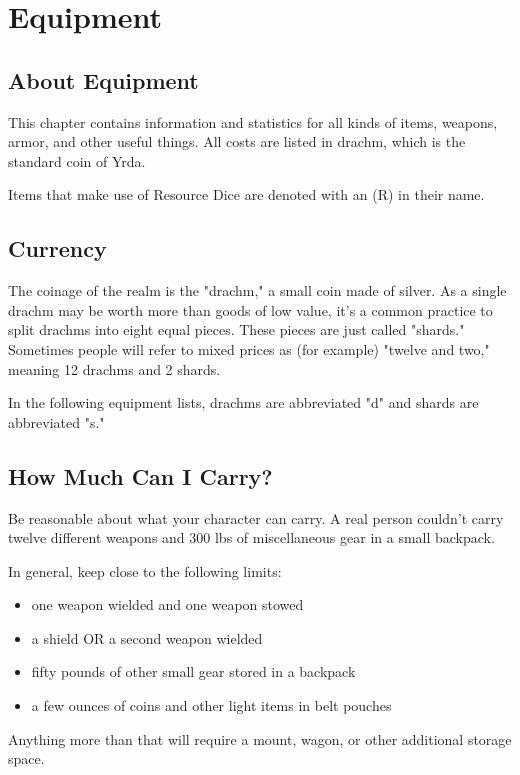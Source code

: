 \chapter{Equipment}

\section{About Equipment}

This chapter contains information and statistics for all kinds
of items, weapons, armor, and other useful things. All costs
are listed in drachm, which is the standard coin of Yrda.

Items that make use of Resource Dice are denoted with an (R) in their name.

\section{Currency}

The coinage of the realm is the "drachm," a small coin made of silver.
As a single drachm may be worth more than goods of low value, it's a
common practice to split drachms into eight equal pieces. These pieces
are just called "shards." Sometimes people will refer to mixed prices as
(for example) "twelve and two," meaning 12 drachms and 2 shards.

In the following equipment lists, drachms are abbreviated "d" and shards are
abbreviated "s."

\section{How Much Can I Carry?}

Be reasonable about what your character can carry. A real person
couldn't carry twelve different weapons and 300 lbs of miscellaneous
gear in a small backpack.

In general, keep close to the following limits:

\begin{itemize}
  \item one weapon wielded and one weapon stowed
  \item a shield OR a second weapon wielded
  \item fifty pounds of other small gear stored in a backpack
  \item a few ounces of coins and other light items in belt pouches
\end{itemize}

Anything more than that will require a mount, wagon, or other
additional storage space.

